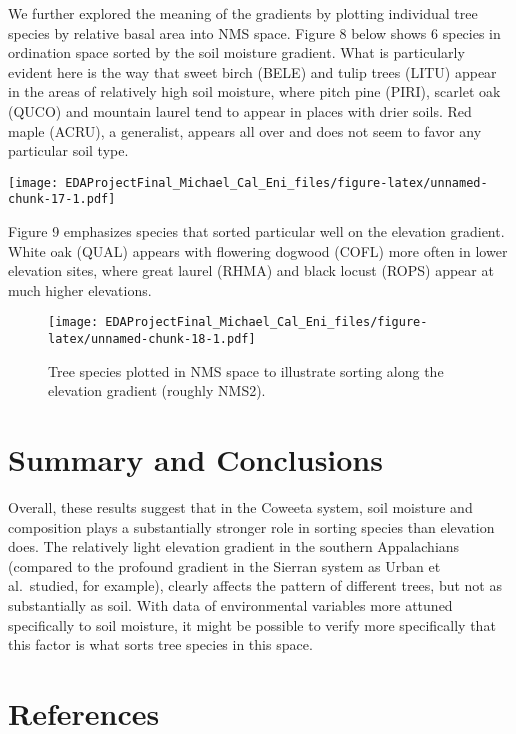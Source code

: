 \documentclass[
  12pt,
]{article}
\begin{document}
\newpage

We further explored the meaning of the gradients by plotting individual
tree species by relative basal area into NMS space. Figure 8 below shows
6 species in ordination space sorted by the soil moisture gradient. What
is particularly evident here is the way that sweet birch (BELE) and
tulip trees (LITU) appear in the areas of relatively high soil moisture,
where pitch pine (PIRI), scarlet oak (QUCO) and mountain laurel tend to
appear in places with drier soils. Red maple (ACRU), a generalist,
appears all over and does not seem to favor any particular soil type.

\texttt{[image: EDAProjectFinal\_Michael\_Cal\_Eni\_files/figure-latex/unnamed-chunk-17-1.pdf]}
\newpage

Figure 9 emphasizes species that sorted particular well on the elevation
gradient. White oak (QUAL) appears with flowering dogwood (COFL) more
often in lower elevation sites, where great laurel (RHMA) and black
locust (ROPS) appear at much higher elevations.

\begin{figure}
\centering
\texttt{[image: EDAProjectFinal\_Michael\_Cal\_Eni\_files/figure-latex/unnamed-chunk-18-1.pdf]}
\caption{Tree species plotted in NMS space to illustrate sorting along
the elevation gradient (roughly NMS2).}
\end{figure}

\newpage

\hypertarget{summary-and-conclusions}{%
\section{Summary and Conclusions}\label{summary-and-conclusions}}

Overall, these results suggest that in the Coweeta system, soil moisture
and composition plays a substantially stronger role in sorting species
than elevation does. The relatively light elevation gradient in the
southern Appalachians (compared to the profound gradient in the Sierran
system as Urban et al.~studied, for example), clearly affects the
pattern of different trees, but not as substantially as soil. With data
of environmental variables more attuned specifically to soil moisture,
it might be possible to verify more specifically that this factor is
what sorts tree species in this space.

\newpage

\hypertarget{references}{%
\section{References}\label{references}}
\end{document}
